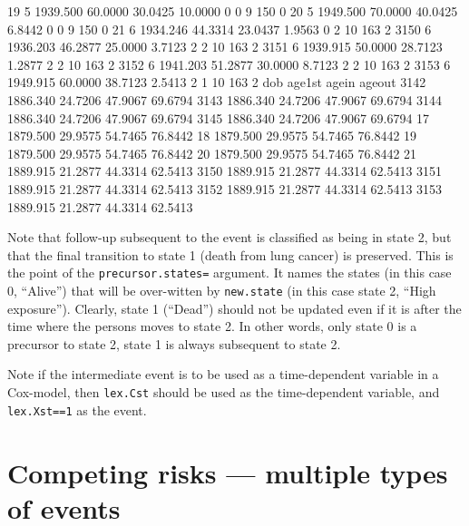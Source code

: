 \documentclass[a4paper,twoside,12pt]{article}
\begin{document}
\begin{Schunk}
\begin{Soutput}
19        5 1939.500 60.0000 30.0425 10.0000       0       0  9 150        0
20        5 1949.500 70.0000 40.0425  6.8442       0       0  9 150        0
21        6 1934.246 44.3314 23.0437  1.9563       0       2 10 163        2
3150      6 1936.203 46.2877 25.0000  3.7123       2       2 10 163        2
3151      6 1939.915 50.0000 28.7123  1.2877       2       2 10 163        2
3152      6 1941.203 51.2877 30.0000  8.7123       2       2 10 163        2
3153      6 1949.915 60.0000 38.7123  2.5413       2       1 10 163        2
          dob  age1st   agein  ageout
3142 1886.340 24.7206 47.9067 69.6794
3143 1886.340 24.7206 47.9067 69.6794
3144 1886.340 24.7206 47.9067 69.6794
3145 1886.340 24.7206 47.9067 69.6794
17   1879.500 29.9575 54.7465 76.8442
18   1879.500 29.9575 54.7465 76.8442
19   1879.500 29.9575 54.7465 76.8442
20   1879.500 29.9575 54.7465 76.8442
21   1889.915 21.2877 44.3314 62.5413
3150 1889.915 21.2877 44.3314 62.5413
3151 1889.915 21.2877 44.3314 62.5413
3152 1889.915 21.2877 44.3314 62.5413
3153 1889.915 21.2877 44.3314 62.5413
\end{Soutput}
\end{Schunk}
Note that follow-up subsequent to the event is classified as being
in state 2, but that the final transition to state 1 (death from lung
cancer) is preserved. This is the point of the \texttt{precursor.states=}
argument. It names the states (in this case 0, ``Alive'') that will be
over-witten by \texttt{new.state} (in this case state 2, ``High
exposure''). Clearly, state 1 (``Dead'') should not be updated even if
it is after the time where the persons moves to state 2. In other
words, only state 0 is a precursor to state 2, state 1 is always
subsequent to state 2.

Note if the intermediate event is to be used as a time-dependent
variable in a Cox-model, then \texttt{lex.Cst} should be used as the
time-dependent variable, and \texttt{lex.Xst==1} as the event.

\section{Competing risks --- multiple types of events}
\end{document}
